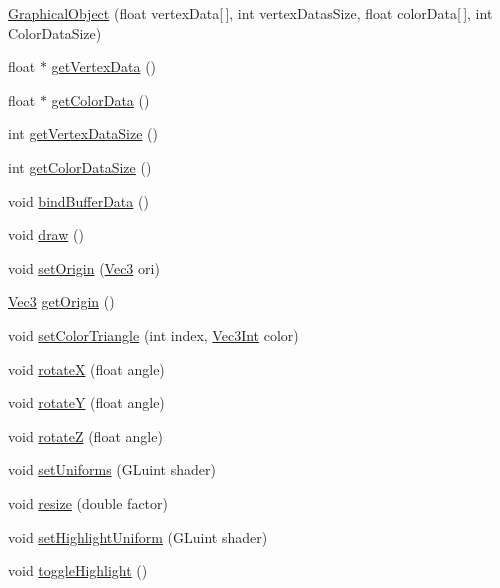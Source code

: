 \begin{DoxyCompactItemize}
\item 
\hyperlink{classGraphicalObject_ad0d5c734f217597805c0a3791130c6b4}{GraphicalObject} (float vertexData\mbox{[}$\,$\mbox{]}, int vertexDatasSize, float colorData\mbox{[}$\,$\mbox{]}, int ColorDataSize)
\item 
float $\ast$ \hyperlink{classGraphicalObject_a97f317570e78a61e753ae184c76eec29}{getVertexData} ()
\item 
float $\ast$ \hyperlink{classGraphicalObject_a50a8d9619867bfb406c9bdc613da8c7a}{getColorData} ()
\item 
int \hyperlink{classGraphicalObject_a3af39e1e523f9cf1405c02ddbc10cae6}{getVertexDataSize} ()
\item 
int \hyperlink{classGraphicalObject_a06aaea6903c56f878c5621ad64464603}{getColorDataSize} ()
\item 
void \hyperlink{classGraphicalObject_a4b5f37bd0b3ac26416ba186ce8a363dd}{bindBufferData} ()
\item 
void \hyperlink{classGraphicalObject_a78ddb331c286a2b749094b05dfbf3a8f}{draw} ()
\item 
void \hyperlink{classGraphicalObject_a4da3f17543b491a807049e60026586a6}{setOrigin} (\hyperlink{structVec3}{Vec3} ori)
\item 
\hyperlink{structVec3}{Vec3} \hyperlink{classGraphicalObject_a70c1917879aeb88cd640c01793ac0bbd}{getOrigin} ()
\item 
void \hyperlink{classGraphicalObject_ac07d03dbd89f6b39ac3b0c97ba138583}{setColorTriangle} (int index, \hyperlink{structVec3Int}{Vec3Int} color)
\item 
void \hyperlink{classGraphicalObject_a9a702570748c867e8717b55d01abcd46}{rotateX} (float angle)
\item 
void \hyperlink{classGraphicalObject_ae2179d2934799c4e7ac8166e6be9a073}{rotateY} (float angle)
\item 
void \hyperlink{classGraphicalObject_a2620d1eac3a41cbb6b0f3dc0bb6b6335}{rotateZ} (float angle)
\item 
void \hyperlink{classGraphicalObject_a0f07f4a577b33f7ece14792fb1d2f99c}{setUniforms} (GLuint shader)
\item 
void \hyperlink{classGraphicalObject_a501ee793d689c1474cf9b5d3ca46b356}{resize} (double factor)
\item 
void \hyperlink{classGraphicalObject_ab39c8a59da860bcfe56d42aac140e879}{setHighlightUniform} (GLuint shader)
\item 
void \hyperlink{classGraphicalObject_aa3541351751ba02f0a370412eb940925}{toggleHighlight} ()

\end{DoxyCompactItemize}
